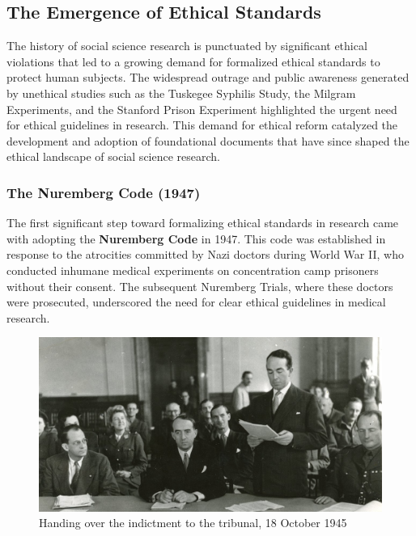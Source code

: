 \documentclass[
]{book}
\begin{document}
\subsection*{The Emergence of Ethical Standards}\label{the-emergence-of-ethical-standards}

The history of social science research is punctuated by significant ethical violations that led to a growing demand for formalized ethical standards to protect human subjects. The widespread outrage and public awareness generated by unethical studies such as the Tuskegee Syphilis Study, the Milgram Experiments, and the Stanford Prison Experiment highlighted the urgent need for ethical guidelines in research. This demand for ethical reform catalyzed the development and adoption of foundational documents that have since shaped the ethical landscape of social science research.

\subsubsection*{The Nuremberg Code (1947)}\label{the-nuremberg-code-1947}

The first significant step toward formalizing ethical standards in research came with adopting the \textbf{Nuremberg Code} in 1947. This code was established in response to the atrocities committed by Nazi doctors during World War II, who conducted inhumane medical experiments on concentration camp prisoners without their consent. The subsequent Nuremberg Trials, where these doctors were prosecuted, underscored the need for clear ethical guidelines in medical research.

\begin{figure}
\centering
\includegraphics[width=1\textwidth,height=\textheight]{images/nuremberg-trial.jpg}
\caption{Handing over the indictment to the tribunal, 18 October 1945}
\end{figure}
\end{document}

